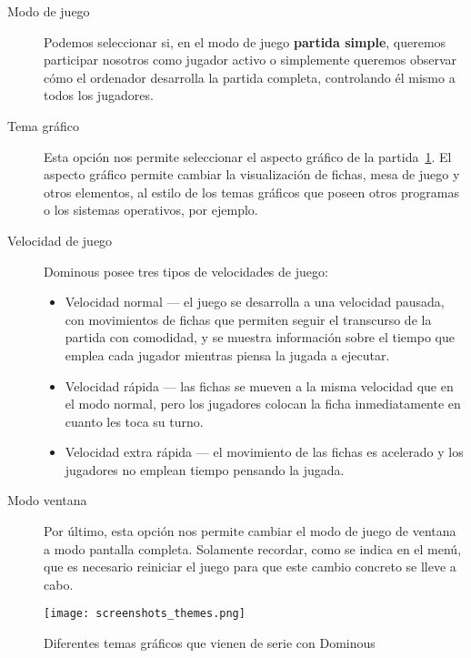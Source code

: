 \begin{description}
    \item[Modo de juego] Podemos seleccionar si, en el modo de juego \textbf{partida simple}, queremos participar nosotros
        como jugador activo o simplemente queremos observar cómo el ordenador desarrolla la partida completa, controlando
        él mismo a todos los jugadores. 
    \item[Tema gráfico] Esta opción nos permite seleccionar el aspecto gráfico de la partida~\ref{fig:screenshotsthemes}.
        El aspecto gráfico permite cambiar la visualización de fichas, mesa de juego y otros elementos, al estilo de los
        temas gráficos que poseen otros programas o los sistemas operativos, por ejemplo.
    \item[Velocidad de juego] Dominous posee tres tipos de velocidades de juego:
        \begin{itemize}
            \item Velocidad normal --- el juego se desarrolla a una velocidad pausada, con movimientos de fichas que permiten
                seguir el transcurso de la partida con comodidad, y se muestra información sobre el tiempo que emplea cada
                jugador mientras piensa la jugada a ejecutar.
            \item Velocidad rápida --- las fichas se mueven a la misma velocidad que en el modo normal, pero los jugadores
                colocan la ficha inmediatamente en cuanto les toca su turno.
            \item Velocidad extra rápida --- el movimiento de las fichas es acelerado y los jugadores no emplean tiempo
                pensando la jugada.
        \end{itemize}
    \item[Modo ventana] Por último, esta opción nos permite cambiar el modo de juego de ventana a modo pantalla completa.
            Solamente recordar, como se indica en el menú, que es necesario reiniciar el juego para que este cambio
            concreto se lleve a cabo.
\end{description}

\begin{figure}[h]
  \begin{center}
    \texttt{[image: screenshots\_themes.png]}
  \end{center}
  \caption{Diferentes temas gráficos que vienen de serie con Dominous}
  \label{fig:screenshotsthemes}
\end{figure}


